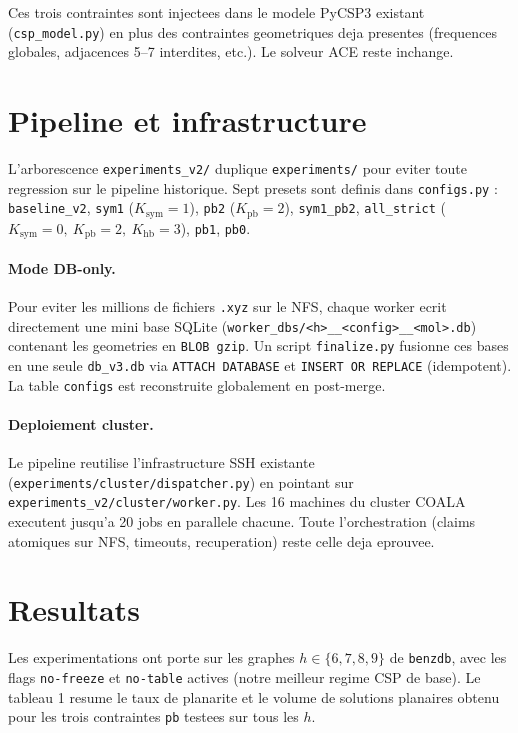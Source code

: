 \documentclass[11pt,a4paper]{article}
\begin{document}
Ces trois contraintes sont injectees dans le modele PyCSP3 existant
(\texttt{csp\_model.py}) en plus des contraintes geometriques deja
presentes (frequences globales, adjacences 5--7 interdites, etc.). Le
solveur ACE reste inchange.

\section{Pipeline et infrastructure}

L'arborescence \texttt{experiments\_v2/} duplique \texttt{experiments/}
pour eviter toute regression sur le pipeline historique. Sept presets
sont definis dans \texttt{configs.py} :
\texttt{baseline\_v2}, \texttt{sym1} ($K_{\text{sym}}{=}1$),
\texttt{pb2} ($K_{\text{pb}}{=}2$), \texttt{sym1\_pb2},
\texttt{all\_strict} ($K_{\text{sym}}{=}0,\ K_{\text{pb}}{=}2,\ K_{\text{hb}}{=}3$),
\texttt{pb1}, \texttt{pb0}.

\paragraph{Mode DB-only.} Pour eviter les millions de fichiers \texttt{.xyz}
sur le NFS, chaque worker ecrit directement une mini base SQLite
(\texttt{worker\_dbs/<h>\_\_<config>\_\_<mol>.db}) contenant les
geometries en \texttt{BLOB gzip}. Un script \texttt{finalize.py}
fusionne ces bases en une seule \texttt{db\_v3.db} via
\texttt{ATTACH DATABASE} et \texttt{INSERT OR REPLACE} (idempotent). La
table \texttt{configs} est reconstruite globalement en post-merge.

\paragraph{Deploiement cluster.} Le pipeline reutilise l'infrastructure
SSH existante (\texttt{experiments/cluster/dispatcher.py}) en pointant
sur \texttt{experiments\_v2/cluster/worker.py}. Les 16 machines du
cluster COALA executent jusqu'a 20 jobs en parallele chacune. Toute
l'orchestration (claims atomiques sur NFS, timeouts, recuperation)
reste celle deja eprouvee.

\section{Resultats}

Les experimentations ont porte sur les graphes $h \in \{6,7,8,9\}$ de
\texttt{benzdb}, avec les flags \texttt{no-freeze} et \texttt{no-table}
actives (notre meilleur regime CSP de base). Le tableau 1 resume le
taux de planarite et le volume de solutions planaires obtenu pour les
trois contraintes \texttt{pb} testees sur tous les $h$.
\end{document}
